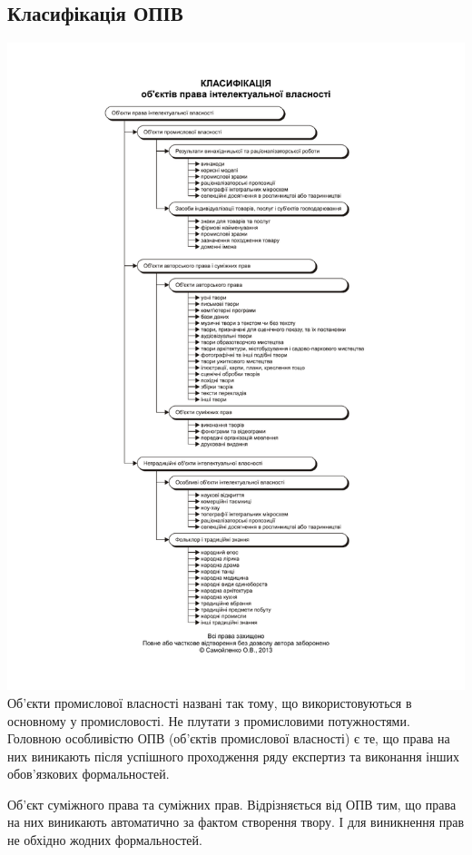 \subsection{Класифікація ОПІВ}
\includegraphics[scale=0.75]{opiv.pdf}
Об’єкти промислової власності названі так тому, що використовуються в основному у промисловості. Не плутати з промисловими потужностями. Головною особливістю ОПВ (об’єктів промислової власності) є те, що права на них виникають після успішного проходження ряду експертиз та виконання інших обов’язкових формальностей. 

Об’єкт суміжного права та суміжних прав. Відрізняється від ОПВ тим, що права на них виникають автоматично за фактом створення твору. І для виникнення прав не обхідно жодних формальностей.
